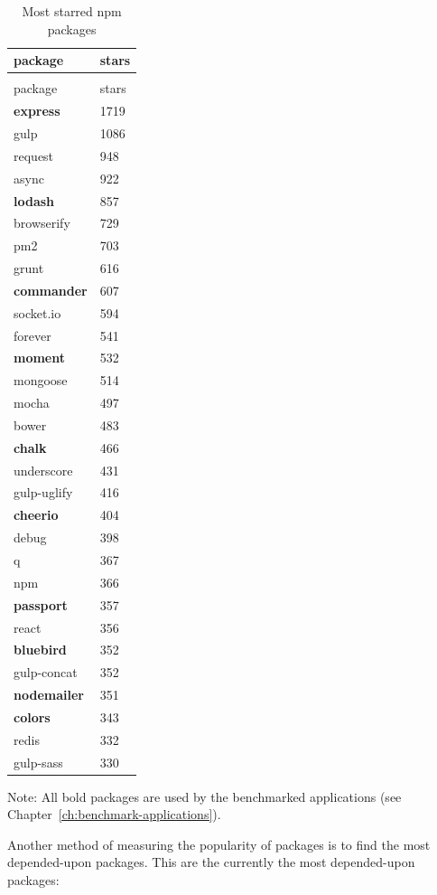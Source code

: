 	\begin{longtable}{ll}
		\caption{Most starred npm packages}\\
		package&stars\\
		\hline
		\endfirsthead
		\caption[]{Most starred npm packages}\\
		package&stars\\
		\hline
		\endhead
		\textbf{express} & 1719 \\
		gulp & 1086 \\
		request & 948 \\
		async & 922 \\
		\textbf{lodash} & 857 \\
		browserify & 729 \\
		pm2 & 703 \\
		grunt & 616 \\
		\textbf{commander} & 607 \\
		socket.io & 594 \\
		forever & 541 \\
		\textbf{moment} & 532 \\
		mongoose & 514 \\
		mocha & 497 \\
		bower & 483 \\
		\textbf{chalk} & 466 \\
		underscore & 431 \\
		gulp-uglify & 416 \\
		\textbf{cheerio} & 404 \\
		debug & 398 \\
		q & 367 \\
		npm & 366 \\
		\textbf{passport} & 357 \\
		react & 356 \\
		\textbf{bluebird} & 352 \\
		gulp-concat & 352 \\
		\textbf{nodemailer} & 351 \\
		\textbf{colors} & 343 \\
		redis & 332 \\
		gulp-sass & 330 \\
	\end{longtable}
Note: All bold packages are used by the benchmarked applications (see Chapter~\ref{ch:benchmark-applications}).



Another method of measuring the popularity of packages is to find the most depended-upon packages. This are the currently the most depended-upon packages\cite{npm-depended}:

